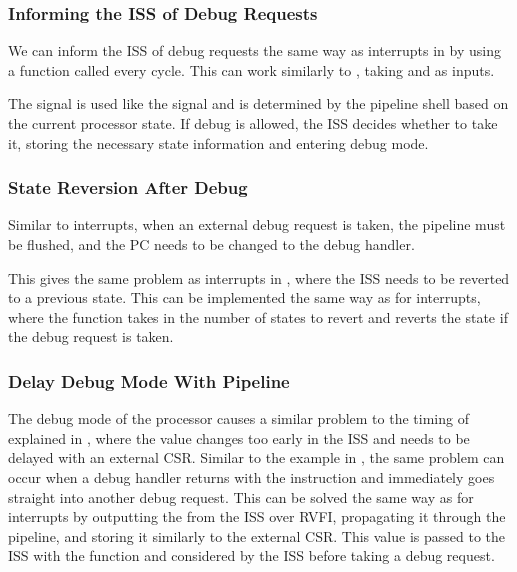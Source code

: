 \subsubsection{Informing the ISS of Debug Requests}

We can inform the ISS of debug requests the same way as interrupts in  by using a  function called every cycle. This can work similarly to , taking  and  as inputs.

The  signal is used like the  signal and is determined by the pipeline shell based on the current processor state. If debug is allowed, the ISS decides whether to take it, storing the necessary state information and entering debug mode.


\subsubsection{State Reversion After Debug}

Similar to interrupts, when an external debug request is taken, the pipeline must be flushed, and the PC needs to be changed to the debug handler. 

This gives the same problem as interrupts in , where the ISS needs to be reverted to a previous state. This can be implemented the same way as for interrupts, where the  function takes in the number of states to revert and reverts the state if the debug request is taken. 

\subsubsection{Delay Debug Mode With Pipeline}

The debug mode of the processor causes a similar problem to the timing of  explained in , where the value changes too early in the ISS and needs to be delayed with an external CSR. Similar to the  example in , the same problem can occur when a debug handler returns with the  instruction and immediately goes straight into another debug request. 
This can be solved the same way as for interrupts by outputting the  from the ISS over RVFI, propagating it through the pipeline, and storing it similarly to the external CSR. 
This value is passed to the ISS with the  function and considered by the ISS before taking a debug request.


